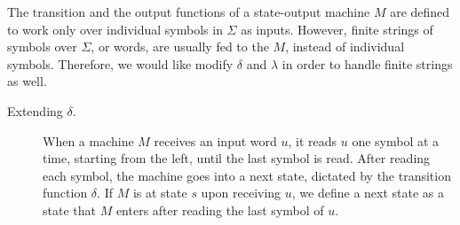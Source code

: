 \documentclass[12pt]{article}
\begin{document}
The transition and the output functions of a state-output machine $M$ are defined to work only over individual symbols in $\Sigma$ as inputs.  However, finite strings of symbols over $\Sigma$, or words, are usually fed to the $M$, instead of individual symbols.  Therefore, we would like modify $\delta$ and $\lambda$ in order to handle finite strings as well.
\begin{description}
\item[Extending $\delta$.]  When a machine $M$ receives an input word $u$, it reads $u$ one symbol at a time, starting from the left, until the last symbol is read.  After reading each symbol, the machine goes into a next state, dictated by the transition function $\delta$.  If $M$ is at state $s$ upon receiving $u$, we define a next state as a state that $M$ enters after reading the last symbol of $u$.  


\end{description}
\end{document}
